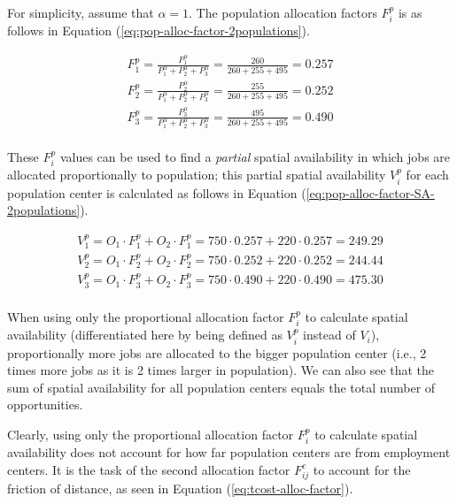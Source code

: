 \documentclass[]{elsarticle} %
\begin{document}
For simplicity, assume that \(\alpha=1\). The population allocation
factors \(F^p_{i}\) is as follows in Equation
(\ref{eq:pop-alloc-factor-2populations}).

\begin{equation}
\label{eq:pop-alloc-factor-2populations}
\begin{array}{l}
F^p_{1} = \frac{P_1 ^\alpha}{P_1^\alpha + P_2^\alpha + P_3^\alpha} = \frac{260}{260 + 255 + 495} = 0.257\\
F^p_{2} = \frac{P_2^\alpha}{P_1^\alpha + P_2^\alpha + P_3^\alpha}  = \frac{255}{260 + 255 + 495} = 0.252\\
F^p_{3} = \frac{P_3^\alpha}{P_1^\alpha + P_2^\alpha + P_3^\alpha}  = \frac{495}{260 + 255 + 495} = 0.490\\
\end{array}
\end{equation}

These \(F^p_{i}\) values can be used to find a \emph{partial} spatial
availability in which jobs are allocated proportionally to population;
this partial spatial availability \(V^p_{i}\) for each population center
is calculated as follows in Equation
(\ref{eq:pop-alloc-factor-SA-2populations}).

\begin{equation}
\label{eq:pop-alloc-factor-SA-2populations}
\begin{array}{l}
V^p_{1} = O_1 \cdot F^p_{1} + O_2 \cdot F^p_{1} = 750 \cdot 0.257 + 220 \cdot 0.257 = 249.29 \\
V^p_{2} = O_1 \cdot F^p_{2} + O_2 \cdot F^p_{2} = 750 \cdot 0.252 + 220 \cdot 0.252 = 244.44 \\
V^p_{3} = O_1 \cdot F^p_{3} + O_2 \cdot F^p_{3}= 750 \cdot 0.490 + 220 \cdot 0.490 = 475.30 \\
\end{array}
\end{equation}

When using only the proportional allocation factor \(F^p_{i}\) to
calculate spatial availability (differentiated here by being defined as
\(V^p_{i}\) instead of \(V_{i}\)), proportionally more jobs are
allocated to the bigger population center (i.e., 2 times more jobs as it
is 2 times larger in population). We can also see that the sum of
spatial availability for all population centers equals the total number
of opportunities.

Clearly, using only the proportional allocation factor \(F^p_{i}\) to
calculate spatial availability does not account for how far population
centers are from employment centers. It is the task of the second
allocation factor \(F^c_{ij}\) to account for the friction of distance,
as seen in Equation (\ref{eq:tcost-alloc-factor}).
\end{document}
